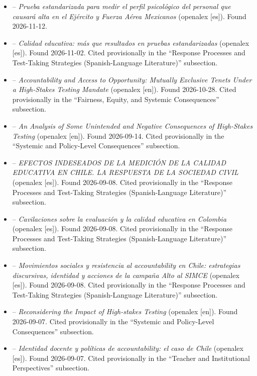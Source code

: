 \documentclass[11pt]{article}
\begin{document}
\begin{itemize}[leftmargin=*]
\item \citet{ortizgomez2017pruebaestandarizada} -- \emph{Prueba estandarizada para medir el perfil psicológico del personal que causará alta en el Ejército y Fuerza Aérea Mexicanos} (openalex [es]). Found 2026-11-12.
\item \citet{gomezyepes2004calidad} -- \emph{Calidad educativa: más que resultados en pruebas estandarizadas} (openalex [es]). Found 2026-11-02. Cited provisionally in the ``Response Processes and Test-Taking Strategies (Spanish-Language Literature)'' subsection.
\item \citet{albrecht2003accountability} -- \emph{Accountability and Access to Opportunity: Mutually Exclusive Tenets Under a High-Stakes Testing Mandate} (openalex [en]). Found 2026-10-28. Cited provisionally in the ``Fairness, Equity, and Systemic Consequences'' subsection.
\item \citet{amreinbeardsley2002unintended} -- \emph{An Analysis of Some Unintended and Negative Consequences of High-Stakes Testing} (openalex [en]). Found 2026-09-14. Cited provisionally in the ``Systemic and Policy-Level Consequences'' subsection.
\item \citet{campos2016efectos} -- \emph{EFECTOS INDESEADOS DE LA MEDICIÓN DE LA CALIDAD EDUCATIVA EN CHILE. LA RESPUESTA DE LA SOCIEDAD CIVIL} (openalex [es]). Found 2026-09-08. Cited provisionally in the ``Response Processes and Test-Taking Strategies (Spanish-Language Literature)'' subsection.
\item \citet{chavesmanzano2020cavilaciones} -- \emph{Cavilaciones sobre la evaluación y la calidad educativa en Colombia} (openalex [es]). Found 2026-09-08. Cited provisionally in the ``Response Processes and Test-Taking Strategies (Spanish-Language Literature)'' subsection.
\item \citet{parcerisa2021movimientos} -- \emph{Movimientos sociales y resistencia al accountability en Chile: estrategias discursivas, identidad y acciones de la campaña Alto al SIMCE} (openalex [es]). Found 2026-09-08. Cited provisionally in the ``Response Processes and Test-Taking Strategies (Spanish-Language Literature)'' subsection.
\item \citet{braun2004highstakes} -- \emph{Reconsidering the Impact of High-stakes Testing} (openalex [en]). Found 2026-09-07. Cited provisionally in the ``Systemic and Policy-Level Consequences'' subsection.
\item \citet{carrasco2019identidad} -- \emph{Identidad docente y políticas de accountability: el caso de Chile} (openalex [es]). Found 2026-09-07. Cited provisionally in the ``Teacher and Institutional Perspectives'' subsection.
\end{itemize}
\end{document}
